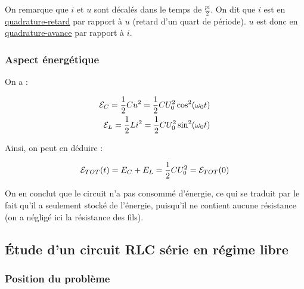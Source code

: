 \documentclass{article}
\begin{document}
On remarque que $i$ et $u$ sont décalés dans le temps de $\frac{pi}{2}$. On dit que $i$ est en \underline{quadrature-retard} par rapport à $u$ (retard d'un quart de période). $u$ est donc en \underline{quadrature-avance} par rapport à $i$.


\subsubsection{Aspect énergétique}

On a :

\begin{align*}\begin{split}
\mathcal{E}_C=\frac{1}{2}Cu^2=\frac{1}{2}CU_0^2\cos^2(\omega_0t)\\
\mathcal{E}_L=\frac{1}{2}Li^2=\frac{1}{2}CU_0^2\sin^2(\omega_0t)\\
\end{split}\end{align*}

Ainsi, on peut en déduire :

\begin{align*}\begin{split}
\mathcal{E}_{TOT}(t)=E_C+E_L=\frac{1}{2}CU_0^2=\mathcal{E}_{TOT}(0)
\end{split}\end{align*}

On en conclut que le circuit n'a pas consommé d'énergie, ce qui se traduit par le fait qu'il a seulement stocké de l'énergie, puisqu'il ne contient aucune résistance (on a négligé ici la résistance des fils).

\subsection{Étude d'un circuit RLC série en régime libre}


\subsubsection{Position du problème}
\end{document}
